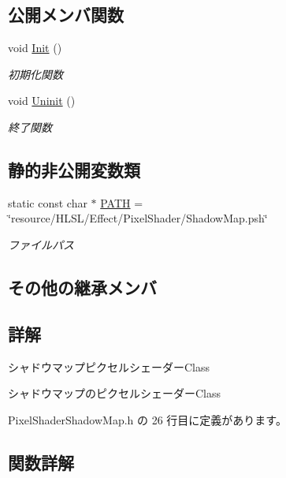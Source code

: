 \subsection*{公開メンバ関数}
\begin{DoxyCompactItemize}
\item 
void \mbox{\hyperlink{class_pixel_shader_shadow_map_a4e68df44391fdd93985ad7b361828f99}{Init}} ()
\begin{DoxyCompactList}\small\item\em 初期化関数 \end{DoxyCompactList}\item 
void \mbox{\hyperlink{class_pixel_shader_shadow_map_aa95a200a1bf5bd91ffaa526a647818f1}{Uninit}} ()
\begin{DoxyCompactList}\small\item\em 終了関数 \end{DoxyCompactList}\end{DoxyCompactItemize}
\subsection*{静的非公開変数類}
\begin{DoxyCompactItemize}
\item 
static const char $\ast$ \mbox{\hyperlink{class_pixel_shader_shadow_map_ae815bcdd558c5618b7b03f7512888ad2}{P\+A\+TH}} = \char`\"{}resource/H\+L\+SL/Effect/Pixel\+Shader/Shadow\+Map.\+psh\char`\"{}
\begin{DoxyCompactList}\small\item\em ファイルパス \end{DoxyCompactList}\end{DoxyCompactItemize}
\subsection*{その他の継承メンバ}


\subsection{詳解}
シャドウマップピクセルシェーダー\+Class 

シャドウマップのピクセルシェーダー\+Class 

 Pixel\+Shader\+Shadow\+Map.\+h の 26 行目に定義があります。



\subsection{関数詳解}
\mbox{\label{class_pixel_shader_shadow_map_a4e68df44391fdd93985ad7b361828f99}} 
